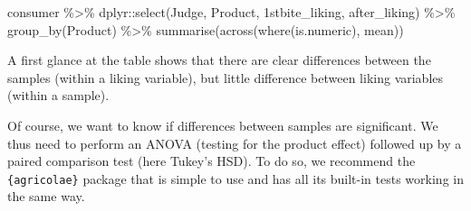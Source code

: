 \documentclass[
]{book}
\newenvironment{Shaded}{\begin{snugshade}}{\end{snugshade}}
\newcommand{\AttributeTok}[1]{\textcolor[rgb]{0.77,0.63,0.00}{#1}}
\newcommand{\FunctionTok}[1]{\textcolor[rgb]{0.00,0.00,0.00}{#1}}
\newcommand{\NormalTok}[1]{#1}
\newcommand{\OtherTok}[1]{\textcolor[rgb]{0.56,0.35,0.01}{#1}}
\newcommand{\SpecialCharTok}[1]{\textcolor[rgb]{0.00,0.00,0.00}{#1}}
\newcommand{\StringTok}[1]{\textcolor[rgb]{0.31,0.60,0.02}{#1}}
\begin{document}
\begin{Shaded}
\begin{Highlighting}[]
\NormalTok{consumer }\SpecialCharTok{\%\textgreater{}\%} 
\NormalTok{  dplyr}\SpecialCharTok{::}\FunctionTok{select}\NormalTok{(Judge, Product, }\StringTok{\textasciigrave{}}\AttributeTok{1stbite\_liking}\StringTok{\textasciigrave{}}\NormalTok{, }\StringTok{\textasciigrave{}}\AttributeTok{after\_liking}\StringTok{\textasciigrave{}}\NormalTok{) }\SpecialCharTok{\%\textgreater{}\%} 
  \FunctionTok{group\_by}\NormalTok{(Product) }\SpecialCharTok{\%\textgreater{}\%} 
  \FunctionTok{summarise}\NormalTok{(}\FunctionTok{across}\NormalTok{(}\FunctionTok{where}\NormalTok{(is.numeric), mean))}
\end{Highlighting}
\end{Shaded}

A first glance at the table shows that there are clear differences between the samples (within a liking variable), but little difference between liking variables (within a sample).

Of course, we want to know if differences between samples are significant. We thus need to perform an ANOVA (testing for the product effect) followed up by a paired comparison test (here Tukey's HSD). To do so, we recommend the \texttt{\{agricolae\}} package that is simple to use and has all its built-in tests working in the same way.

\begin{Shaded}
\end{Shaded}
\end{document}
